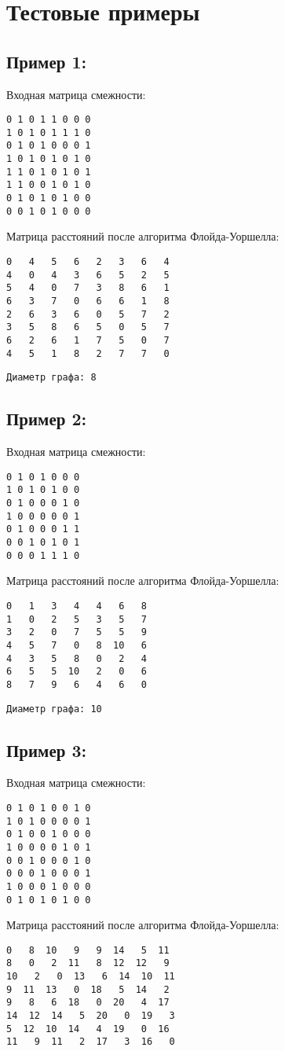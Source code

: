\documentclass[12pt]{article}
\begin{document}
\section{Тестовые примеры}

\subsection*{Пример 1:}

Входная матрица смежности:
\begin{verbatim}
0 1 0 1 1 0 0 0
1 0 1 0 1 1 1 0
0 1 0 1 0 0 0 1
1 0 1 0 1 0 1 0
1 1 0 1 0 1 0 1
1 1 0 0 1 0 1 0
0 1 0 1 0 1 0 0
0 0 1 0 1 0 0 0
\end{verbatim}
Матрица расстояний после алгоритма Флойда-Уоршелла:
\begin{verbatim}
0   4   5   6   2   3   6   4
4   0   4   3   6   5   2   5
5   4   0   7   3   8   6   1
6   3   7   0   6   6   1   8
2   6   3   6   0   5   7   2
3   5   8   6   5   0   5   7
6   2   6   1   7   5   0   7
4   5   1   8   2   7   7   0
\end{verbatim}

\begin{verbatim}
Диаметр графа: 8
\end{verbatim}

\subsection*{Пример 2:}

Входная матрица смежности:
\begin{verbatim}
0 1 0 1 0 0 0
1 0 1 0 1 0 0
0 1 0 0 0 1 0
1 0 0 0 0 0 1
0 1 0 0 0 1 1
0 0 1 0 1 0 1
0 0 0 1 1 1 0
\end{verbatim}
Матрица расстояний после алгоритма Флойда-Уоршелла:
\begin{verbatim}
0   1   3   4   4   6   8
1   0   2   5   3   5   7
3   2   0   7   5   5   9
4   5   7   0   8  10   6
4   3   5   8   0   2   4
6   5   5  10   2   0   6
8   7   9   6   4   6   0
\end{verbatim}

\begin{verbatim}
Диаметр графа: 10
\end{verbatim}

\subsection*{Пример 3:}

Входная матрица смежности:
\begin{verbatim}
0 1 0 1 0 0 1 0
1 0 1 0 0 0 0 1
0 1 0 0 1 0 0 0
1 0 0 0 0 1 0 1
0 0 1 0 0 0 1 0
0 0 0 1 0 0 0 1
1 0 0 0 1 0 0 0
0 1 0 1 0 1 0 0
\end{verbatim}
Матрица расстояний после алгоритма Флойда-Уоршелла:
\begin{verbatim}
0   8  10   9   9  14   5  11
8   0   2  11   8  12  12   9
10   2   0  13   6  14  10  11
9  11  13   0  18   5  14   2
9   8   6  18   0  20   4  17
14  12  14   5  20   0  19   3
5  12  10  14   4  19   0  16
11   9  11   2  17   3  16   0
\end{verbatim}
\end{document}
